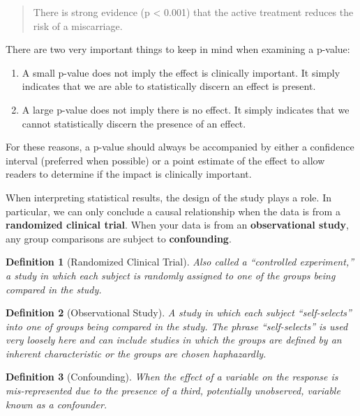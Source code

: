 \documentclass[
]{book}
\providecommand{\tightlist}{%
  \setlength{\itemsep}{0pt}\setlength{\parskip}{0pt}}
\theoremstyle{plain}
\theoremstyle{mydefn}
\newtheorem{definition}{Definition}[chapter]
\theoremstyle{myexmpl}
\theoremstyle{remark}
\begin{document}
\begin{quote}
There is strong evidence (p \textless{} 0.001) that the active treatment reduces the risk of a miscarriage.
\end{quote}

There are two very important things to keep in mind when examining a p-value:

\begin{enumerate}
\def\labelenumi{\arabic{enumi}.}
\tightlist
\item
  A small p-value does not imply the effect is clinically important. It simply indicates that we are able to statistically discern an effect is present.
\item
  A large p-value does not imply there is no effect. It simply indicates that we cannot statistically discern the presence of an effect.
\end{enumerate}

For these reasons, a p-value should always be accompanied by either a confidence interval (preferred when possible) or a point estimate of the effect to allow readers to determine if the impact is clinically important.

When interpreting statistical results, the design of the study plays a role. In particular, we can only conclude a causal relationship when the data is from a \textbf{randomized clinical trial}. When your data is from an \textbf{observational study}, any group comparisons are subject to \textbf{confounding}.

\begin{definition}[Randomized Clinical Trial]
Also called a ``controlled experiment,'' a study in which each subject is randomly assigned to one of the groups being compared in the study.
\end{definition}

\begin{definition}[Observational Study]
A study in which each subject ``self-selects'' into one of groups being compared in the study. The phrase ``self-selects'' is used very loosely here and can include studies in which the groups are defined by an inherent characteristic or the groups are chosen haphazardly.
\end{definition}

\begin{definition}[Confounding]
When the effect of a variable on the response is mis-represented due to the presence of a third, potentially unobserved, variable known as a confounder.
\end{definition}
\end{document}
